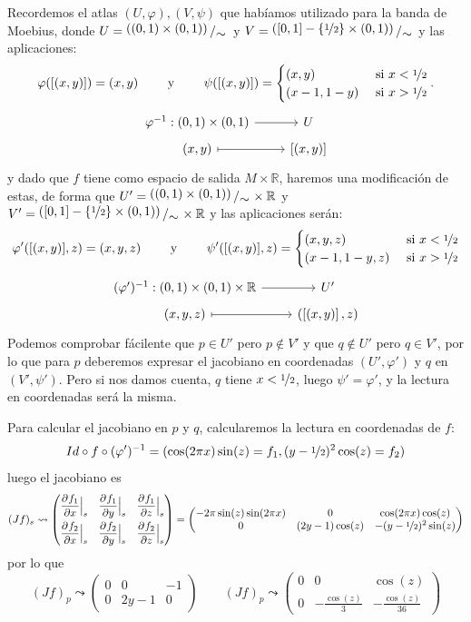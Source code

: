 \begin{sol}
Recordemos el atlas $(U,\varphi), (V, \psi)$ que hab\'iamos utilizado para la banda de Moebius, donde  $U = \modulo{((0, 1) \times (0, 1))}{\sim}$ y $V =  \modulo{([0, 1] - \{\nicefrac{1}{2}\} \times (0, 1))}{\sim}$ y las aplicaciones:
$$\varphi([(x,y)]) = (x,y) \qquad \text{ y } \qquad \psi([(x,y)])=\begin{cases}
        (x,y) & \text{ si } x < \nicefrac{1}{2} \\  (x-1,1-y) & \text{ si } x > \nicefrac{1}{2} 
    \end{cases}.$$
$$\bt \varphi^{-1} : (0,1) \times (0,1) \arrow{r} & U \\[-5mm]  (x,y) \arrow[mapsto]{r} & \left[(x,y)\right] \et $$
y dado que $f$ tiene como espacio de salida $M \times \mathbb R$, haremos una modificaci\'on de estas, de forma que $U' = \modulo{((0, 1) \times (0, 1))}{\sim} \times \mathbb R$ y $V' =  \modulo{([0, 1] - \{\nicefrac{1}{2}\} \times (0, 1))}{\sim}  \times \mathbb R$ y las aplicaciones ser\'an:
$$\varphi'([(x,y)],z) = (x,y,z) \qquad \text{ y } \qquad \psi'([(x,y)],z)=\begin{cases}
        (x,y,z) & \text{ si } x < \nicefrac{1}{2} \\  (x-1,1-y,z) & \text{ si } x > \nicefrac{1}{2} 
    \end{cases}$$
$$\bt (\varphi')^{-1} :  (0,1) \times (0,1)  \times \mathbb R \arrow{r} & U' \\[-5mm]  (x,y,z) \arrow[mapsto]{r} & (\left[(x,y)\right],z) \et $$
Podemos comprobar f\'acilente que $p \in U'$ pero $p \nin V'$ y que $q \nin U'$ pero $q \in V'$, por lo que para $p$ deberemos expresar el jacobiano en coordenadas $(U', \varphi')$ y $q$ en $(V', \psi')$. Pero si nos damos cuenta, $q$ tiene $x<\nicefrac{1}{2}$, luego $\psi' = \varphi'$, y la lectura en coordenadas ser\'a la misma.

Para calcular el jacobiano en $p$ y $q$, calcularemos la lectura en coordenadas de $f$:
$$Id \circ f \circ (\varphi')^{-1} = (\cos(2\pi x)\sin(z) = f_1,(y-\nicefrac{1}{2})^2 \cos(z) = f_2 )$$
luego el jacobiano es 
$$(Jf)_s \leadsto \begin{pmatrix}
    \dfrac{\partial^{} f_1}{\partial x}\Big|_{s} & \dfrac{\partial^{} f_1}{\partial y}\Big|_{s}  & \dfrac{\partial^{} f_1}{\partial z}\Big|_{s}  \\[3mm]  \dfrac{\partial^{} f_2}{\partial x}\Big|_{s}  & \dfrac{\partial^{} f_2}{\partial y}\Big|_{s}  & \dfrac{\partial^{} f_2}{\partial z}\Big|_{s} 
\end{pmatrix} = \begin{pmatrix}
    -2\pi\sin(z)\sin(2\pi x) & 0 & \cos(2\pi x) \cos(z) \\ 0 &(2y-1) \cos(z) & -(y-\nicefrac{1}{2})^2 \sin(z)
\end{pmatrix}$$
    por lo que 
    $$(Jf)_p\leadsto \begin{pmatrix}
        0 & 0 & -1 \\ 0 & 2y-1 & 0
    \end{pmatrix}\qquad (Jf)_p\leadsto \begin{pmatrix}
        0 & 0 & \cos(z) \\ 0 & -\frac{\cos(z)}{3} & -\frac{\cos(z)}{36}
    \end{pmatrix}$$
\end{sol}
